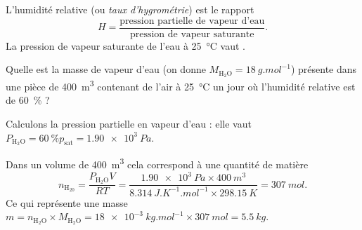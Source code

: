 
\finEntrainement








\hauteurLargeurCadreReponse		{6mm}{4cm}
\initialisationEntrainement

L'humidité relative (ou \emph{taux d'hygrométrie}) est le rapport 
\[
H = \frac{\text{pression partielle de vapeur d'eau}}{\text{pression de vapeur saturante}}.
\]
La pression de vapeur saturante de l'eau à \SI{25}{\celsius} vaut .

\smallskip

\debutEntrainement


\begin{enonce}
Quelle est la masse de vapeur d'eau (on donne $M_\mathrm{H_2O} = \SI{18}{g.mol^{-1}}$) présente dans une pièce de \SI{400}{m^3} contenant de l'air à \SI{25}{\celsius} un jour où l'humidité relative est de \SI{60}{\percent} ?
\end{enonce}


\begin{corrige}
Calculons la pression partielle en vapeur d'eau : elle vaut $P_\mathrm{H_2O}=\SI{60}{\percent} p_\text{sat}=\SI{1.90e3}{Pa}$. 

Dans un volume de \SI{400}{m^3} cela correspond à une quantité de matière
\[
n_\mathrm{H_20}=\frac{P_\mathrm{H_2O}V}{RT}=\frac{\SI{1.90e3}{Pa}\times \SI{400}{m^3}}{\SI{8,314}{J.K^{-1}.mol^{-1}} \times \SI{298,15}{K}}=\SI{307}{mol}.
\]
Ce qui représente une masse $m=n_\mathrm{H_2O}\times M_\mathrm{H_2O}=\SI{18e-3}{kg.mol^{-1}}\times \SI{307}{mol}=\SI{5.5}{kg}$.
\end{corrige}

